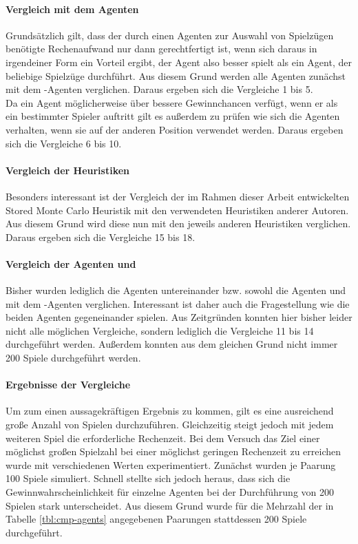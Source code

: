 \paragraph{Vergleich mit dem Agenten }
Grundsätzlich gilt, dass der durch einen Agenten zur Auswahl von Spielzügen benötigte Rechenaufwand nur dann gerechtfertigt ist, wenn sich daraus in irgendeiner Form ein Vorteil ergibt, der Agent also besser spielt als ein Agent, der beliebige Spielzüge durchführt. Aus diesem Grund werden alle Agenten zunächst mit dem -Agenten verglichen. Daraus ergeben sich die Vergleiche 1 bis 5.
\\Da ein Agent möglicherweise über bessere Gewinnchancen verfügt, wenn er als ein bestimmter Spieler auftritt gilt es außerdem zu prüfen wie sich die Agenten verhalten, wenn sie auf der anderen Position verwendet werden. Daraus ergeben sich die Vergleiche 6 bis 10.

\paragraph{Vergleich der Heuristiken}
Besonders interessant ist der Vergleich der im Rahmen dieser Arbeit entwickelten Stored Monte Carlo Heuristik mit den verwendeten Heuristiken anderer Autoren. Aus diesem Grund wird diese nun mit den jeweils anderen Heuristiken verglichen. Daraus ergeben sich die Vergleiche 15 bis 18.

\paragraph{Vergleich der Agenten \mxZitat{\abp} und }
Bisher wurden lediglich die Agenten \mxZitat{\abp} untereinander bzw. sowohl die Agenten \mxZitat{\abp} und  mit dem -Agenten verglichen. Interessant ist daher auch die Fragestellung wie die beiden Agenten gegeneinander spielen. Aus Zeitgründen konnten hier bisher leider nicht alle möglichen Vergleiche, sondern lediglich die Vergleiche 11 bis 14 durchgeführt werden. Außerdem konnten aus dem gleichen Grund nicht immer 200 Spiele durchgeführt werden.

\paragraph{Ergebnisse der Vergleiche}
\label{p:vgl-result}
Um zum einen aussagekräftigen Ergebnis zu kommen, gilt es eine ausreichend große Anzahl von Spielen durchzuführen. Gleichzeitig steigt jedoch mit jedem weiteren Spiel die erforderliche Rechenzeit. Bei dem Versuch das Ziel einer möglichst großen Spielzahl bei einer möglichst geringen Rechenzeit zu erreichen wurde mit verschiedenen Werten experimentiert. Zunächst wurden je Paarung 100 Spiele simuliert. Schnell stellte sich jedoch heraus, dass sich die Gewinnwahrscheinlichkeit für einzelne Agenten bei der Durchführung von 200 Spielen stark unterscheidet. Aus diesem Grund wurde für die Mehrzahl der in Tabelle \ref{tbl:cmp-agents} angegebenen Paarungen stattdessen 200 Spiele durchgeführt.

